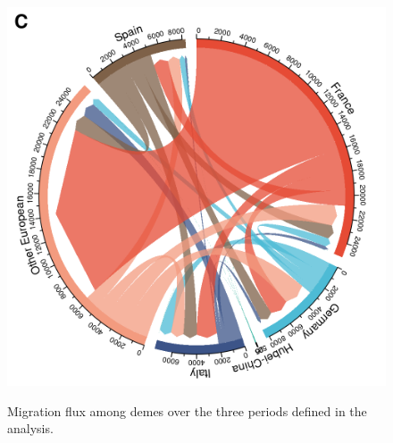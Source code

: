 \documentclass[12pt]{article}
\begin{document}
\begin{figure}[!tbp]
\begin{minipage}[t]{0.4\textwidth}
  \label{fig:migs2}
  \end{minipage}
  \begin{minipage}[t]{0.4\textwidth}
  \includegraphics[width=\textwidth]{201030_europe3_figtraj09c.png}
  \label{fig:migs3}
  \end{minipage}
  \caption{Migration flux among demes over the three periods defined in the analysis.}
  \label{fig:migs}
\end{figure}
\end{document}
